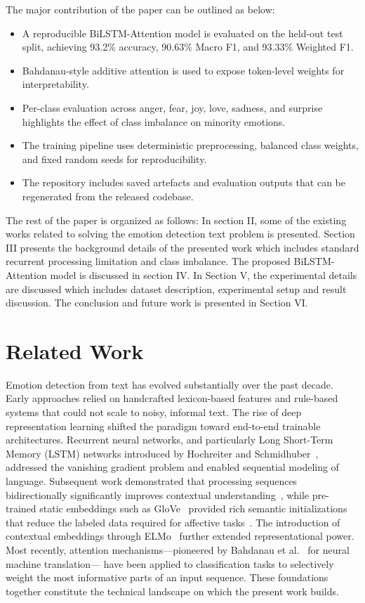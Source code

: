 \documentclass[conference]{IEEEtran}
\begin{document}
The major contribution of the paper can be outlined as below:
\begin{itemize}
  \item A reproducible BiLSTM-Attention model is evaluated on the held-out test split, achieving 93.2\% accuracy, 90.63\% Macro F1, and 93.33\% Weighted F1.
  \item Bahdanau-style additive attention is used to expose token-level weights for interpretability.
  \item Per-class evaluation across anger, fear, joy, love, sadness, and surprise highlights the effect of class imbalance on minority emotions.
  \item The training pipeline uses deterministic preprocessing, balanced class weights, and fixed random seeds for reproducibility.
  \item The repository includes saved artefacts and evaluation outputs that can be regenerated from the released codebase.
\end{itemize}

The rest of the paper is organized as follows: In section II, some of the existing works related to solving the emotion detection text problem is presented. Section III presents the background details of the presented work which includes standard recurrent processing limitation and class imbalance. The proposed BiLSTM-Attention model is discussed in section IV. In Section V, the experimental details are discussed which includes dataset description, experimental setup and result discussion. The conclusion and future work is presented in Section VI.

\section{Related Work}

Emotion detection from text has evolved substantially over the past 
decade. Early approaches relied on handcrafted lexicon-based features 
and rule-based systems that could not scale to noisy, informal text. 
The rise of deep representation learning shifted the paradigm toward 
end-to-end trainable architectures. Recurrent neural networks, and 
particularly Long Short-Term Memory (LSTM) networks introduced by 
Hochreiter and Schmidhuber~\cite{hochreiter1997}, addressed the 
vanishing gradient problem and enabled sequential modeling of language. 
Subsequent work demonstrated that processing sequences bidirectionally 
significantly improves contextual understanding~\cite{huang2015}, 
while pre-trained static embeddings such as GloVe~\cite{pennington2014} 
provided rich semantic initializations that reduce the labeled data 
required for affective tasks~\cite{howard2018}. The introduction of 
contextual embeddings through ELMo~\cite{peters2018} further extended 
representational power. Most recently, attention mechanisms---pioneered 
by Bahdanau et al.~\cite{bahdanau2015} for neural machine translation---%
have been applied to classification tasks to selectively weight the 
most informative parts of an input sequence. These foundations together 
constitute the technical landscape on which the present work builds.
\end{document}

